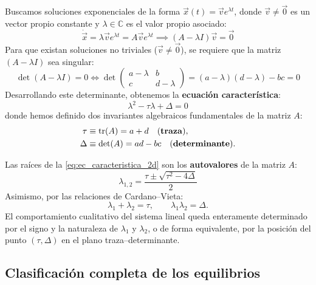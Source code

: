 Buscamos soluciones exponenciales de la forma $\vec{x}(t) = \vec{v} e^{\lambda t}$, donde $\vec{v} \neq \vec{0}$ es un vector propio constante y $\lambda \in \mathbb{C}$ es el valor propio asociado:
\begin{equation}
    \dot{\vec{x}} = \lambda \vec{v} e^{\lambda t} = A \vec{v} e^{\lambda t} \implies (A - \lambda I)\vec{v} = \vec{0}
\end{equation}
Para que existan soluciones no triviales ($\vec{v} \neq \vec{0}$), se requiere que la matriz $(A - \lambda I)$ sea singular:
\begin{equation}
    \det(A - \lambda I) = 0 \iff \det \begin{pmatrix} a - \lambda & b \\ c & d - \lambda \end{pmatrix} = (a - \lambda)(d - \lambda) - bc = 0
\end{equation}
Desarrollando este determinante, obtenemos la \textbf{ecuación característica}:
\begin{equation}
    \lambda^2 - \tau \lambda + \Delta = 0
    \label{eq:ec_caracteristica_2d}
\end{equation}
donde hemos definido dos invariantes algebraicos fundamentales de la matriz $A$:
\begin{align}
    \tau &\equiv \operatorname{tr}(A) = a + d \quad \text{(\textbf{traza})}, \label{eq:def_traza} \\
    \Delta &\equiv \det(A) = ad - bc \quad \text{(\textbf{determinante})}. \label{eq:def_det}
\end{align}

Las raíces de la \cref{eq:ec_caracteristica_2d} son los \textbf{autovalores} de la matriz $A$:
\begin{equation}
    \lambda_{1,2} = \frac{\tau \pm \sqrt{\tau^2 - 4\Delta}}{2}
    \label{eq:autovalores_formula}
\end{equation}
Asimismo, por las relaciones de Cardano--Vieta:
\begin{equation}
    \lambda_1 + \lambda_2 = \tau, \qquad \lambda_1 \lambda_2 = \Delta.
    \label{eq:vieta_autovalores}
\end{equation}
El comportamiento cualitativo del sistema lineal queda enteramente determinado por el signo y la naturaleza de $\lambda_1$ y $\lambda_2$, o de forma equivalente, por la posición del punto $(\tau, \Delta)$ en el plano traza--determinante.

\subsection{Clasificación completa de los equilibrios}

